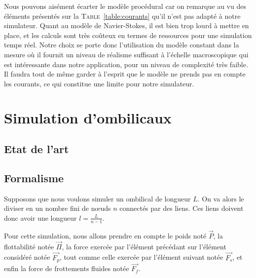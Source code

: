 				Nous pouvons aisément écarter le modèle procédural car on remarque au vu des éléments présentés sur la \textsc{Table}~\ref{table:courants} qu'il n'est pas adapté à notre simulateur. Quant au modèle de Navier-Stokes, il est bien trop lourd à mettre en place, et les calculs sont très coûteux en termes de ressources pour une simulation temps réel. Notre choix se porte donc l'utilisation du modèle constant dans la mesure où il fournit un niveau de réalisme suffisant à l'échelle macroscopique qui est intéressante dans notre application, pour un niveau de complexité très faible. Il faudra tout de même garder à l'esprit que le modèle ne prends pas en compte les courants, ce qui constitue une limite pour notre simulateur.

		\section{Simulation d'ombilicaux}

			\subsection{Etat de l'art}

			\subsection{Formalisme}

				Supposons que nous voulons simuler un ombilical de longueur $L$. On va alors le diviser en un nombre fini de n\oe uds $n$ connectés par des liens. Ces liens doivent donc avoir une longueur $l=\frac{L}{n-1}$.
			
				Pour cette simulation, nous allons prendre en compte le poids noté $\overrightarrow{P}$, la flottabilité notée $\overrightarrow{\Pi}$, la force exercée par l'élément précédant sur l'élément considéré notée $\overrightarrow{F_p}$, tout comme celle exercée par l'élément suivant notée $\overrightarrow{F_s}$, et enfin la force de frottements fluides notée $\overrightarrow{F_f}$.
				
